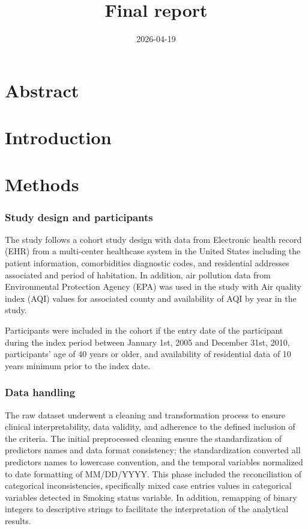 \documentclass[
]{article}
\title{Final report}
\author{}
\date{\vspace{-2.5em}2026-04-19}
\begin{document}
\maketitle

\section{Abstract}\label{abstract}

\section{Introduction}\label{introduction}

\section{Methods}\label{methods}

\subsubsection{Study design and
participants}\label{study-design-and-participants}

The study follows a cohort study design with data from Electronic health
record (EHR) from a multi-center healthcase system in the United States
including the patient information, comorbidities diagnostic codes, and
residential addresses associated and period of habitation. In addition,
air pollution data from Environmental Protection Agency (EPA) was used
in the study with Air quality index (AQI) values for associated county
and availability of AQI by year in the study.

Participants were included in the cohort if the entry date of the
participant during the index period between January 1st, 2005 and
December 31st, 2010, participants' age of 40 years or older, and
availability of residential data of 10 years minimum prior to the index
date.

\subsubsection{Data handling}\label{data-handling}

The raw dataset underwent a cleaning and transformation process to
ensure clinical interpretability, data validity, and adherence to the
defined inclusion of the criteria. The initial preprocessed cleaning
ensure the standardization of predictors names and data format
consistency; the standardization converted all predictors names to
lowercase convention, and the temporal variables normalized to date
formatting of MM/DD/YYYY. This phase included the reconciliation of
categorical inconsistencies, specifically mixed case entries values in
categorical variables detected in Smoking status variable. In addition,
remapping of binary integers to descriptive strings to facilitate the
interpretation of the analytical results.
\end{document}

